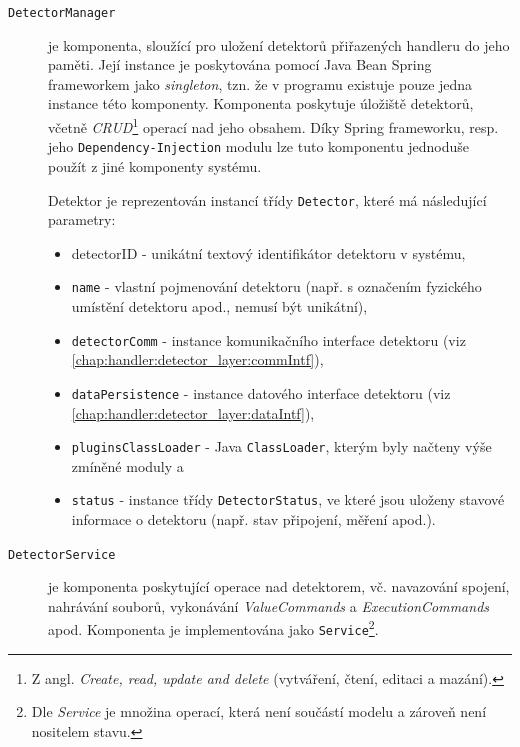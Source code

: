 \begin{description}
  \item[\texttt{DetectorManager}] je komponenta, sloužící pro uložení detektorů přiřazených handleru do jeho paměti. Její instance je poskytována pomocí Java Bean Spring frameworkem jako \textit{singleton}, tzn. že v programu existuje pouze jedna instance této komponenty. Komponenta poskytuje úložiště detektorů, včetně \textit{CRUD}\footnote{Z angl. \textit{Create, read, update and delete} (vytváření, čtení, editaci a mazání).} operací nad jeho obsahem. Díky Spring frameworku, resp. jeho \texttt{Dependency-Injection} modulu lze tuto komponentu jednoduše použít z jiné komponenty systému.
  
  Detektor je reprezentován instancí třídy \texttt{Detector}, které má následující parametry:
  \begin{itemize}
    \item \texttt{}{detectorID} - unikátní textový identifikátor detektoru v systému,
    \item \texttt{name} - vlastní pojmenování detektoru (např. s označením fyzického umístění detektoru apod., nemusí být unikátní),
    \item \texttt{detectorComm} - instance komunikačního interface detektoru (viz \ref{chap:handler:detector_layer:commIntf}),
    \item \texttt{dataPersistence} - instance datového interface detektoru (viz \ref{chap:handler:detector_layer:dataIntf}),
    \item \texttt{pluginsClassLoader} - Java \texttt{ClassLoader}, kterým byly načteny výše zmíněné moduly a
    \item \texttt{status} - instance třídy \texttt{DetectorStatus}, ve které jsou uloženy stavové informace o detektoru (např. stav připojení, měření apod.).
  \end{itemize}
  
  \item[\texttt{DetectorService}] je komponenta poskytující operace nad detektorem, vč. navazování spojení, nahrávání souborů, vykonávání \textit{ValueCommands} a \textit{ExecutionCommands} apod. Komponenta je implementována jako \texttt{Service}\footnote{Dle \cite{Evans-domain-driven-design} \textit{Service} je množina operací, která není součástí modelu a zároveň není nositelem stavu.}.
\end{description}

